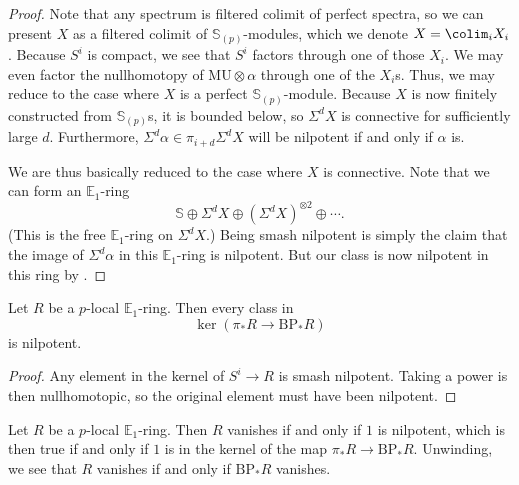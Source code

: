 \documentclass[../notes.tex]{subfiles}
\begin{document}
\begin{proof}
	Note that any spectrum is filtered colimit of perfect spectra, so we can present $X$ as a filtered colimit of $\mathbb S_{(p)}$-modules, which we denote $X=\colim_iX_i$. Because $S^i$ is compact, we see that $S^i$ factors through one of those $X_i$. We may even factor the nullhomotopy of $\mathrm{MU}\otimes\alpha$ through one of the $X_i$s. Thus, we may reduce to the case where $X$ is a perfect $\mathbb S_{(p)}$-module. Because $X$ is now finitely constructed from $\mathbb S_{(p)}$s, it is bounded below, so $\Sigma^dX$ is connective for sufficiently large $d$. Furthermore, $\Sigma^d\alpha\in\pi_{i+d}\Sigma^dX$ will be nilpotent if and only if $\alpha$ is.

	We are thus basically reduced to the case where $X$ is connective. Note that we can form an $\mathbb E_1$-ring
	\[\mathbb S\oplus\Sigma^dX\oplus\left(\Sigma^dX\right)^{\otimes2}\oplus\cdots.\]
	(This is the free $\mathbb E_1$-ring on $\Sigma^dX$.) Being smash nilpotent is simply the claim that the image of $\Sigma^d\alpha$ in this $\mathbb E_1$-ring is nilpotent. But our class is now nilpotent in this ring by .
\end{proof}
\begin{corollary} \label{cor:map-to-bp-null}
	Let $R$ be a $p$-local $\mathbb E_1$-ring. Then every class in
	\[\ker(\pi_*R\to\mathrm{BP}_*R)\]
	is nilpotent.
\end{corollary}
\begin{proof}
	Any element in the kernel of $S^i\to R$ is smash nilpotent. Taking a power is then nullhomotopic, so the original element must have been nilpotent.
\end{proof}
\begin{example} \label{ex:test-ring-zero-bp}
	Let $R$ be a $p$-local $\mathbb E_1$-ring. Then $R$ vanishes if and only if $1$ is nilpotent, which is then true if and only if $1$ is in the kernel of the map $\pi_*R\to\mathrm{BP}_*R$. Unwinding, we see that $R$ vanishes if and only if $\mathrm{BP}_*R$ vanishes.
\end{example}
\end{document}
